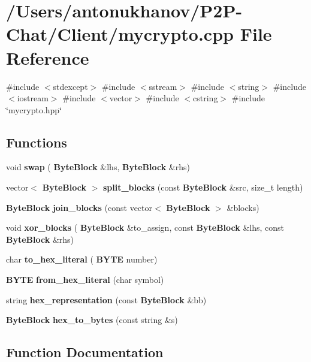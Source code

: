 \section{/\+Users/antonukhanov/\+P2\+P-\/\+Chat/\+Client/mycrypto.cpp File Reference}
\label{mycrypto_8cpp}
{\ttfamily \#include $<$stdexcept$>$}\newline
{\ttfamily \#include $<$sstream$>$}\newline
{\ttfamily \#include $<$string$>$}\newline
{\ttfamily \#include $<$iostream$>$}\newline
{\ttfamily \#include $<$vector$>$}\newline
{\ttfamily \#include $<$cstring$>$}\newline
{\ttfamily \#include \char`\"{}mycrypto.\+hpp\char`\"{}}\newline
\subsection*{Functions}
\begin{DoxyCompactItemize}
\item 
void \textbf{ swap} (\textbf{ Byte\+Block} \&lhs, \textbf{ Byte\+Block} \&rhs)
\item 
vector$<$ \textbf{ Byte\+Block} $>$ \textbf{ split\+\_\+blocks} (const \textbf{ Byte\+Block} \&src, size\+\_\+t length)
\item 
\textbf{ Byte\+Block} \textbf{ join\+\_\+blocks} (const vector$<$ \textbf{ Byte\+Block} $>$ \&blocks)
\item 
void \textbf{ xor\+\_\+blocks} (\textbf{ Byte\+Block} \&to\+\_\+assign, const \textbf{ Byte\+Block} \&lhs, const \textbf{ Byte\+Block} \&rhs)
\item 
char \textbf{ to\+\_\+hex\+\_\+literal} (\textbf{ B\+Y\+TE} number)
\item 
\textbf{ B\+Y\+TE} \textbf{ from\+\_\+hex\+\_\+literal} (char symbol)
\item 
string \textbf{ hex\+\_\+representation} (const \textbf{ Byte\+Block} \&bb)
\item 
\textbf{ Byte\+Block} \textbf{ hex\+\_\+to\+\_\+bytes} (const string \&s)
\end{DoxyCompactItemize}


\subsection{Function Documentation}
\mbox{\label{mycrypto_8cpp_a62f60a18a3ac811f2e323f66257a3690}} 
